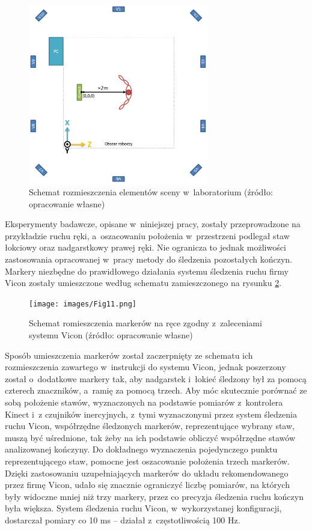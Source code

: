 \begin{figure}[!htb]
	\centering
	\includegraphics[width=0.7\textwidth]{images/scene.png}
	\caption{Schemat rozmieszczenia elementów sceny w~laboratorium  (źródło: opracowanie własne)}
	\label{fig:experiments:scene}
\end{figure}
		  
		 
Eksperymenty badawcze, opisane w~niniejszej pracy, zostały przeprowadzone na przykładzie ruchu ręki, a~oszacowaniu położenia w~przestrzeni podlegał staw łokciowy oraz nadgarstkowy prawej ręki. Nie ogranicza to jednak możliwości zastosowania opracowanej w~pracy metody do śledzenia pozostałych kończyn. Markery niezbędne do prawidłowego działania systemu śledzenia ruchu firmy Vicon zostały umieszczone według schematu zamieszczonego na rysunku \ref{fig:experiments:viconArm}.
		
\begin{figure}[!htb]
	\centering
	\texttt{[image: images/Fig11.png]}
	\caption{Schemat romieszczenia markerów na ręce zgodny z~zaleceniami systemu Vicon  (źródło: opracowanie własne)}
	\label{fig:experiments:viconArm}
\end{figure}
				
Sposób umieszczenia markerów został zaczerpnięty ze schematu ich rozmieszczenia zawartego w~instrukcji do systemu Vicon, jednak poszerzony został o~dodatkowe markery tak, aby nadgarstek i~łokieć śledzony był za pomocą czterech znaczników, a~ramię za pomocą trzech. Aby móc skutecznie porównać ze sobą położenie stawów, wyznaczonych na podstawie pomiarów z~kontrolera Kinect i~z czujników inercyjnych, z~tymi wyznaczonymi przez system śledzenia ruchu Vicon, współrzędne śledzonych markerów, reprezentujące wybrany staw, muszą być uśrednione, tak żeby na ich podstawie obliczyć współrzędne stawów analizowanej kończyny. Do dokładnego wyznaczenia pojedynczego punktu reprezentującego staw, pomocne jest oszacowanie położenia trzech markerów. Dzięki zastosowaniu uzupełniających markerów do układu rekomendowanego przez firmę Vicon, udało się znacznie ograniczyć liczbę pomiarów, na których były widoczne mniej niż trzy markery, przez co precyzja śledzenia ruchu kończyn była większa. System śledzenia ruchu Vicon, w~wykorzystanej konfiguracji, dostarczał pomiary co 10 ms -- działał z~częstotliwością 100 Hz.  
				
